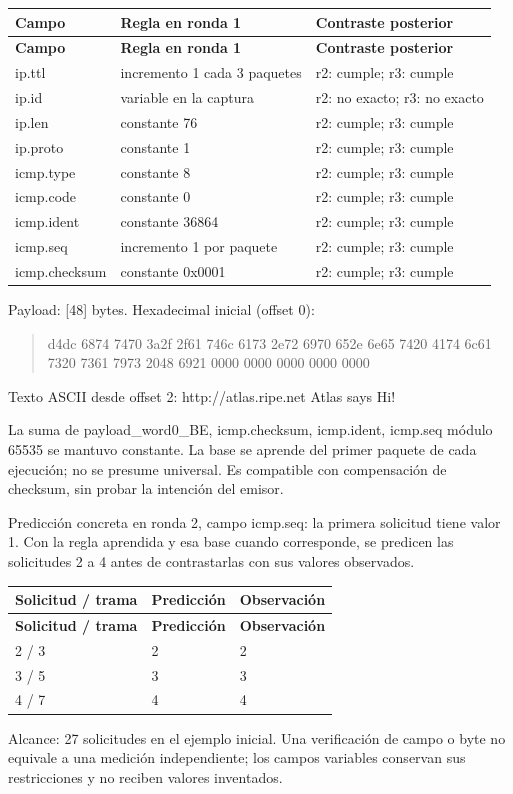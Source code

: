 \begingroup
\fontsize{9}{11}\selectfont
\addtocounter{table}{-1}
\begin{longtable}{p{3.1cm}p{5.8cm}p{5.1cm}}
\toprule
\textbf{Campo} & \textbf{Regla en ronda 1} & \textbf{Contraste posterior} \\ \midrule
\endfirsthead
\toprule
\textbf{Campo} & \textbf{Regla en ronda 1} & \textbf{Contraste posterior} \\ \midrule
\endhead
ip.ttl & incremento 1 cada 3 paquetes & r2: cumple; r3: cumple \\
ip.id & variable en la captura & r2: no exacto; r3: no exacto \\
ip.len & constante 76 & r2: cumple; r3: cumple \\
ip.proto & constante 1 & r2: cumple; r3: cumple \\
icmp.type & constante 8 & r2: cumple; r3: cumple \\
icmp.code & constante 0 & r2: cumple; r3: cumple \\
icmp.ident & constante 36864 & r2: cumple; r3: cumple \\
icmp.seq & incremento 1 por paquete & r2: cumple; r3: cumple \\
icmp.checksum & constante 0x0001 & r2: cumple; r3: cumple \\
\bottomrule
\end{longtable}
\endgroup
Payload: [48] bytes. Hexadecimal inicial (offset 0):

\begin{quote}\ttfamily\footnotesize\raggedright d4dc 6874 7470 3a2f 2f61 746c 6173 2e72 6970 652e 6e65 7420 4174 6c61 7320 7361 7973 2048 6921 0000 0000 0000 0000 0000\end{quote}
Texto ASCII desde offset 2: http://atlas.ripe.net Atlas says Hi!

La suma de payload\_\allowbreak{}word0\_\allowbreak{}BE, icmp.checksum, icmp.ident, icmp.seq módulo 65535 se mantuvo constante. La base se aprende del primer paquete de cada ejecución; no se presume universal. Es compatible con compensación de checksum, sin probar la intención del emisor.

Predicción concreta en ronda 2, campo icmp.seq: la primera solicitud tiene valor 1. Con la regla aprendida y esa base cuando corresponde, se predicen las solicitudes 2 a 4 antes de contrastarlas con sus valores observados.

\begingroup
\fontsize{9}{11}\selectfont
\addtocounter{table}{-1}
\begin{longtable}{p{3.2cm}p{5.1cm}p{5.1cm}}
\toprule
\textbf{Solicitud / trama} & \textbf{Predicción} & \textbf{Observación} \\ \midrule
\endfirsthead
\toprule
\textbf{Solicitud / trama} & \textbf{Predicción} & \textbf{Observación} \\ \midrule
\endhead
2 / 3 & 2 & 2 \\
3 / 5 & 3 & 3 \\
4 / 7 & 4 & 4 \\
\bottomrule
\end{longtable}
\endgroup
Alcance: 27 solicitudes en el ejemplo inicial. Una verificación de campo o byte no equivale a una medición independiente; los campos variables conservan sus restricciones y no reciben valores inventados.

